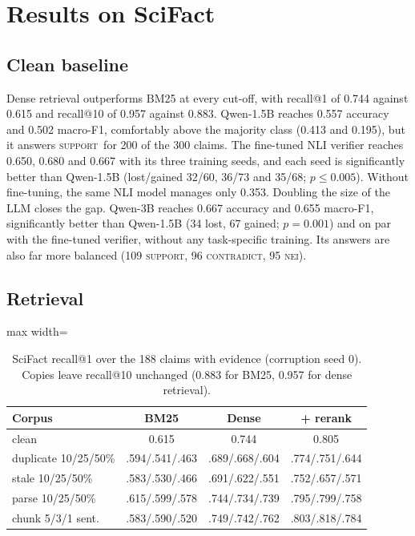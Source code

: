 \documentclass[11pt]{article}
\newcommand{\Sup}{\textsc{support}}
\newcommand{\Con}{\textsc{contradict}}
\newcommand{\Nei}{\textsc{nei}}
\begin{document}
\section{Results on SciFact}

\subsection{Clean baseline}
Dense retrieval outperforms BM25 at every cut-off, with recall@1 of 0.744 against 0.615 and recall@10 of
0.957 against 0.883. Qwen-1.5B reaches 0.557 accuracy and 0.502 macro-F1, comfortably above the majority
class (0.413 and 0.195), but it answers \Sup\ for 200 of the 300 claims. The fine-tuned NLI verifier
reaches 0.650, 0.680 and 0.667 with its three training seeds, and each seed is significantly better than
Qwen-1.5B (lost/gained 32/60, 36/73 and 35/68; $p \le 0.005$). Without fine-tuning, the same NLI model
manages only 0.353. Doubling the size of the LLM closes the gap. Qwen-3B reaches 0.667 accuracy and
0.655 macro-F1, significantly better than Qwen-1.5B (34 lost, 67 gained; $p=0.001$) and on par with the
fine-tuned verifier, without any task-specific training. Its answers are also far more balanced
(109 \Sup, 96 \Con, 95 \Nei).

\subsection{Retrieval}

\begin{table}[t]
\centering\small
\setlength\tabcolsep{4pt}
\begin{adjustbox}{max width=\columnwidth}
\begin{tabular}{lccc}
\toprule
Corpus & BM25 & Dense & + rerank \\
\midrule
clean & 0.615 & 0.744 & 0.805 \\
duplicate 10/25/50\% & .594/.541/.463 & .689/.668/.604 & .774/.751/.644 \\
stale 10/25/50\% & .583/.530/.466 & .691/.622/.551 & .752/.657/.571 \\
parse 10/25/50\% & .615/.599/.578 & .744/.734/.739 & .795/.799/.758 \\
chunk 5/3/1 sent. & .583/.590/.520 & .749/.742/.762 & .803/.818/.784 \\
\bottomrule
\end{tabular}
\end{adjustbox}
\caption{SciFact recall@1 over the 188 claims with evidence (corruption seed 0). Copies leave recall@10
unchanged (0.883 for BM25, 0.957 for dense retrieval).}
\label{tab:retrieval}
\end{table}
\end{document}
